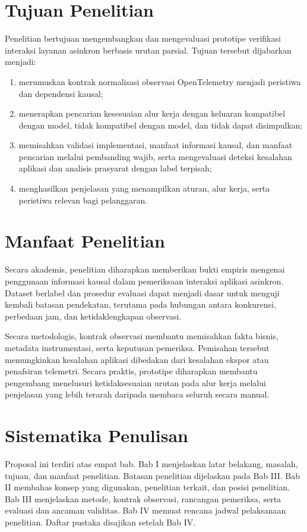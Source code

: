 \section{Tujuan Penelitian}
Penelitian bertujuan mengembangkan dan mengevaluasi prototipe verifikasi interaksi layanan asinkron berbasis urutan parsial. Tujuan tersebut dijabarkan menjadi:
\begin{enumerate}
  \item merumuskan kontrak normalisasi observasi OpenTelemetry menjadi peristiwa dan dependensi kausal;
  \item menerapkan pencarian kesesuaian alur kerja dengan keluaran kompatibel dengan model, tidak kompatibel dengan model, dan tidak dapat disimpulkan;
  \item memisahkan validasi implementasi, manfaat informasi kausal, dan manfaat pencarian melalui pembanding wajib, serta mengevaluasi deteksi kesalahan aplikasi dan analisis prasyarat dengan label terpisah;
  \item menghasilkan penjelasan yang menampilkan aturan, alur kerja, serta peristiwa relevan bagi pelanggaran.
\end{enumerate}

\section{Manfaat Penelitian}
Secara akademis, penelitian diharapkan memberikan bukti empiris mengenai penggunaan informasi kausal dalam pemeriksaan interaksi aplikasi asinkron. Dataset berlabel dan prosedur evaluasi dapat menjadi dasar untuk menguji kembali batasan pendekatan, terutama pada hubungan antara konkurensi, perbedaan jam, dan ketidaklengkapan observasi.

Secara metodologis, kontrak observasi membantu memisahkan fakta bisnis, metadata instrumentasi, serta keputusan pemeriksa. Pemisahan tersebut memungkinkan kesalahan aplikasi dibedakan dari kesalahan ekspor atau penafsiran telemetri. Secara praktis, prototipe diharapkan membantu pengembang menelusuri ketidaksesuaian urutan pada alur kerja melalui penjelasan yang lebih terarah daripada membaca seluruh  secara manual.

\section{Sistematika Penulisan}
Proposal ini terdiri atas empat bab. Bab I menjelaskan latar belakang, masalah, tujuan, dan manfaat penelitian. Batasan penelitian dijelaskan pada Bab III. Bab II membahas konsep yang digunakan, penelitian terkait, dan posisi penelitian. Bab III menjelaskan metode, kontrak observasi, rancangan pemeriksa, serta evaluasi dan ancaman validitas. Bab IV memuat rencana jadwal pelaksanaan penelitian. Daftar pustaka disajikan setelah Bab IV.
